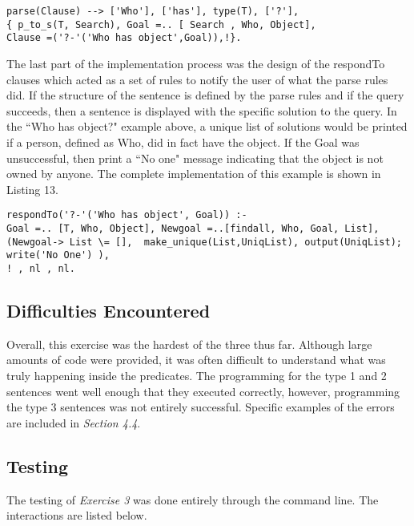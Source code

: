 \documentclass[11pt]{article}
\newcommand{\forceindent}{\leavevmode{\parindent=1em\indent}}
\begin{document}
\begin{lstlisting}[caption= Parse of type: Who has object?, label= Listing 12]
 parse(Clause) --> ['Who'], ['has'], type(T), ['?'],
{ p_to_s(T, Search), Goal =.. [ Search , Who, Object], 
Clause =('?-'('Who has object',Goal)),!}. 				
\end{lstlisting}	
	
The last part of the implementation process was the design of the respondTo clauses which acted as a set of rules to notify the user of what the parse rules did. If the structure of the sentence is defined by the parse rules and if the query succeeds, then a sentence is displayed with the specific solution to the query. In the ``Who has object?" example above, a unique list of solutions would be printed if a person, defined as Who, did in fact have the object. If the Goal was unsuccessful, then print a ``No one" message indicating that the object is not owned by anyone. The complete implementation of this example is shown in Listing 13. 

\begin{lstlisting}[caption= Parse of type: Who has object?, label= Listing 13]
respondTo('?-'('Who has object', Goal)) :- 
Goal =.. [T, Who, Object], Newgoal =..[findall, Who, Goal, List],
(Newgoal-> List \= [],  make_unique(List,UniqList), output(UniqList); 
write('No One') ), 
! , nl , nl.				
\end{lstlisting}
	\subsection{Difficulties Encountered}
\forceindent Overall, this exercise was the hardest of the three thus far. Although large amounts of code were provided, it was often difficult to understand what was truly happening inside the predicates. The programming for the type 1 and 2 sentences went well enough that they executed correctly, however, programming the type 3 sentences was not entirely successful. Specific examples of the errors are included in \emph{Section 4.4}.	
	\subsection{Testing}
\forceindent The testing of \emph{Exercise 3} was done entirely through the command line. The interactions are listed below.
\end{document}
